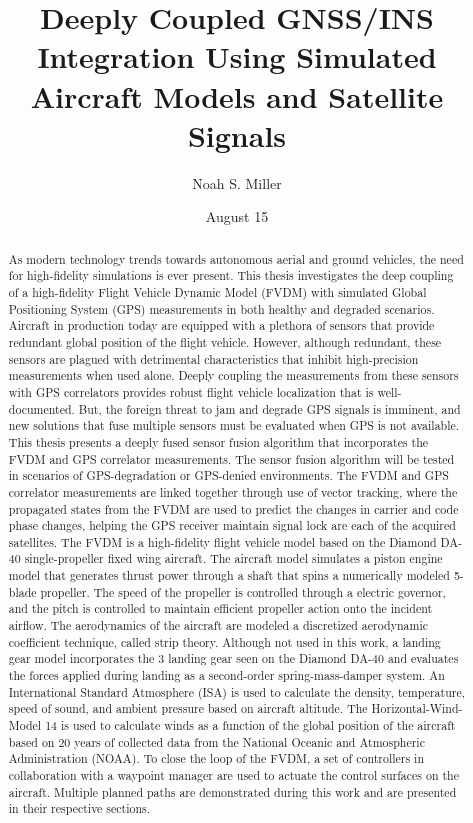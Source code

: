 \documentclass[12pt]{report}
\title{Deeply Coupled GNSS/INS Integration Using Simulated Aircraft Models and Satellite Signals}
\author{Noah S. Miller}
\date{August 15}
\begin{document}
\begin{romanpages}      %

  \TitlePage{}
  \begin{abstract}
    As modern technology trends towards autonomous aerial and ground vehicles, the need for high-fidelity simulations is ever present. This thesis investigates the deep coupling of a high-fidelity Flight Vehicle Dynamic Model (FVDM) with simulated Global Positioning System (GPS) measurements in both healthy and degraded scenarios.
    Aircraft in production today are equipped with a plethora of sensors that provide redundant global position of the flight vehicle. However, although redundant, these sensors are plagued with detrimental characteristics that inhibit high-precision measurements when used alone. Deeply coupling the measurements from these sensors with GPS correlators provides robust flight vehicle localization that is well-documented. But, the foreign threat to jam and degrade GPS signals is imminent, and new solutions that fuse multiple sensors must be evaluated when GPS is not available.
    This thesis presents a deeply fused sensor fusion algorithm that incorporates the FVDM and GPS correlator measurements. The sensor fusion algorithm will be tested in scenarios of GPS-degradation or GPS-denied environments. The FVDM and GPS correlator measurements are linked together through use of vector tracking, where the propagated states from the FVDM are used to predict the changes in carrier and code phase changes, helping the GPS receiver maintain signal lock are each of the acquired satellites.
    The FVDM is a high-fidelity flight vehicle model based on the Diamond DA-40 single-propeller fixed wing aircraft. The aircraft model simulates a piston engine model that generates thrust power through a shaft that spins a numerically modeled 5-blade propeller. The speed of the propeller is controlled through a electric governor, and the pitch is controlled to maintain efficient propeller action onto the incident airflow. The aerodynamics of the aircraft are modeled a discretized aerodynamic coefficient technique, called strip theory. Although not used in this work, a landing gear model incorporates the 3 landing gear seen on the Diamond DA-40 and evaluates the forces applied during landing as a second-order spring-mass-damper system. An International Standard Atmosphere (ISA) is used to calculate the density, temperature, speed of sound, and ambient pressure based on aircraft altitude. The Horizontal-Wind-Model 14 is used to calculate winds as a function of the global position of the aircraft based on 20 years of collected data from the National Oceanic and Atmospheric Administration (NOAA). To close the loop of the FVDM, a set of controllers in collaboration with a waypoint manager are used to actuate the control surfaces on the aircraft. Multiple planned paths are demonstrated during this work and are presented in their respective sections.

\end{abstract}
\end{romanpages}
\end{document}
